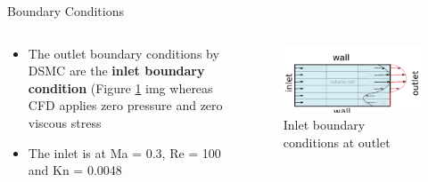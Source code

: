 \documentclass{beamer}
\begin{document}
        \begin{frame}{Boundary Conditions}
            \begin{columns}
                \begin{column}{0.5\linewidth}
                    \begin{itemize}
                        \setlength\itemsep{0.25cm}
                                
                        \item<1-> The outlet boundary conditions by DSMC are the \textbf{inlet boundary condition} (Figure \ref{img:Outlet} img whereas CFD applies zero pressure and zero viscous stress	
                        
                        \item<2-> The inlet is at Ma = 0.3, Re = 100 and Kn = 0.0048
                    \end{itemize}                    
                \end{column} 
            
                \begin{column}{0.5\linewidth}
                    \begin{figure}
                        \centering
                        \includegraphics[width=\linewidth]{Pictures/Literature/Outlet.png}
                        \caption{Inlet boundary conditions at outlet}
                        \label{img:Outlet}
                    \end{figure}
                \end{column}
            \end{columns}
        \end{frame}
\end{document}
